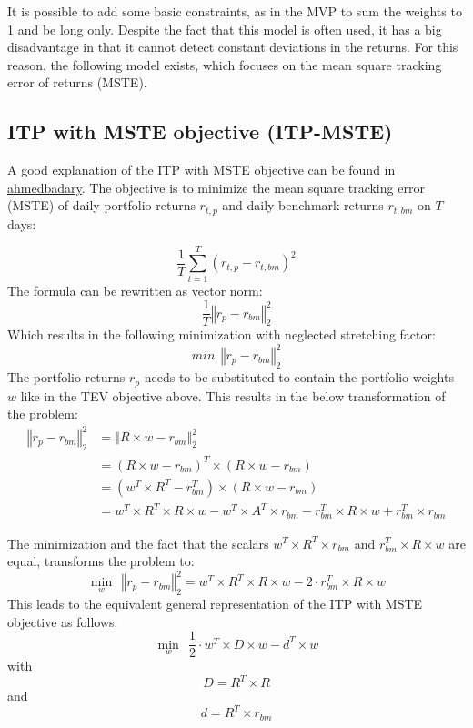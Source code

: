 \documentclass[
  oneside]{book}
\begin{document}
It is possible to add some basic constraints, as in the MVP to sum the weights to 1 and be long only. Despite the fact that this model is often used, it has a big disadvantage in that it cannot detect constant deviations in the returns. For this reason, the following model exists, which focuses on the mean square tracking error of returns (MSTE).

\hypertarget{itp-with-mste-objective-itp-mste}{%
\subsection{ITP with MSTE objective (ITP-MSTE)}\label{itp-with-mste-objective-itp-mste}}

A good explanation of the ITP with MSTE objective can be found in \href{https://ahmedbadary.github.io/work_files/research/conv_opt/hw/iftp}{ahmedbadary}. The objective is to minimize the mean square tracking error (MSTE) of daily portfolio returns \(r_{t, p}\) and daily benchmark returns \(r_{t, bm}\) on \(T\) days:

\[
  \frac{1}{T} \sum^T_{t=1}(r_{t, p}-r_{t, bm})^2
\]
The formula can be rewritten as vector norm:
\[
  \frac{1}{T} \left\Vert r_{p}-r_{bm} \right\Vert_2^2
\]
Which results in the following minimization with neglected stretching factor:
\[
 min \ \  \left\Vert r_{p}-r_{bm} \right\Vert_2^2
\]
The portfolio returns \(r_p\) needs to be substituted to contain the portfolio weights \(w\) like in the TEV objective above. This results in the below transformation of the problem:
\begin{align*}
  \left\Vert r_{p}-r_{bm} \right\Vert_2^2 &= \left\Vert R \times w-r_{bm} \right\Vert_2^2 \\ 
  &= (R \times w-r_{bm})^T \times (R \times w-r_{bm}) \\ 
  &= (w^T \times R^T-r_{bm}^T) \times (R \times w-r_{bm}) \\ 
  &= w^T \times R^T \times R \times w - w^T \times A^T \times r_{bm} - r_{bm}^T \times R \times w + r_{bm}^T \times r_{bm} 
\end{align*}

The minimization and the fact that the scalars \(w^T \times R^T \times r_{bm}\) and \(r_{bm}^T \times R \times w\) are equal, transforms the problem to:
\[
  \min\limits_{w} \ \  \left\Vert r_{p}-r_{bm} \right\Vert_2^2 
  = w^T \times R^T \times R \times w - 2\cdot r_{bm}^T \times R \times w
\]
This leads to the equivalent general representation of the ITP with MSTE objective as follows:
\[
  \min\limits_{w} \ \ \frac{1}{2} \cdot w^T \times D \times w - d^T \times w
\]
with
\[
D = R^T \times R
\]
and
\[
  d = R^T \times r_{bm}
\]
\end{document}
